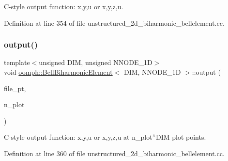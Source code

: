 C-\/style output function\+: x,y,u or x,y,z,u. 



Definition at line 354 of file unstructured\+\_\+2d\+\_\+biharmonic\+\_\+bellelement.\+cc.

\mbox{\label{classoomph_1_1BellBiharmonicElement_a2c1ef4d6456d860a357dff65fa310bf2}} 
\subsubsection{\texorpdfstring{output()}{output()}\hspace{0.1cm}{\footnotesize\ttfamily [4/4]}}
{\footnotesize\ttfamily template$<$unsigned D\+IM, unsigned N\+N\+O\+D\+E\+\_\+1D$>$ \\
void \hyperlink{classoomph_1_1BellBiharmonicElement}{oomph\+::\+Bell\+Biharmonic\+Element}$<$ D\+IM, N\+N\+O\+D\+E\+\_\+1D $>$\+::output (\begin{DoxyParamCaption}\item[{F\+I\+LE $\ast$}]{file\+\_\+pt,  }\item[{const unsigned \&}]{n\+\_\+plot }\end{DoxyParamCaption})\hspace{0.3cm}{\ttfamily [inline]}}



C-\/style output function\+: x,y,u or x,y,z,u at n\+\_\+plot$^\wedge$\+D\+IM plot points. 



Definition at line 360 of file unstructured\+\_\+2d\+\_\+biharmonic\+\_\+bellelement.\+cc.

\mbox{\label{classoomph_1_1BellBiharmonicElement_a99fcec7056c18d59f747180bd49ef744}} 
